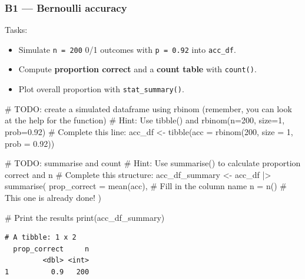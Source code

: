 \documentclass[
  letterpaper,
  DIV=11,
  numbers=noendperiod]{scrartcl}
\newenvironment{Shaded}{\begin{snugshade}}{\end{snugshade}}
\newcommand{\AlertTok}[1]{\textcolor[rgb]{0.68,0.00,0.00}{#1}}
\newcommand{\AttributeTok}[1]{\textcolor[rgb]{0.40,0.45,0.13}{#1}}
\newcommand{\CommentTok}[1]{\textcolor[rgb]{0.37,0.37,0.37}{#1}}
\newcommand{\DecValTok}[1]{\textcolor[rgb]{0.68,0.00,0.00}{#1}}
\newcommand{\FloatTok}[1]{\textcolor[rgb]{0.68,0.00,0.00}{#1}}
\newcommand{\FunctionTok}[1]{\textcolor[rgb]{0.28,0.35,0.67}{#1}}
\newcommand{\NormalTok}[1]{\textcolor[rgb]{0.00,0.23,0.31}{#1}}
\newcommand{\OtherTok}[1]{\textcolor[rgb]{0.00,0.23,0.31}{#1}}
\newcommand{\SpecialCharTok}[1]{\textcolor[rgb]{0.37,0.37,0.37}{#1}}
\providecommand{\tightlist}{%
  \setlength{\itemsep}{0pt}\setlength{\parskip}{0pt}}
\begin{document}
\subsubsection{B1 --- Bernoulli accuracy}\label{b1-bernoulli-accuracy}

Tasks:

\begin{itemize}
\tightlist
\item
  Simulate \texttt{n\ =\ 200} 0/1 outcomes with \texttt{p\ =\ 0.92} into
  \texttt{acc\_df}.
\item
  Compute \textbf{proportion correct} and a \textbf{count table} with
  \texttt{count()}.
\item
  Plot overall proportion with \texttt{stat\_summary()}.
\end{itemize}

\begin{Shaded}
\begin{Highlighting}[]
\CommentTok{\# }\AlertTok{TODO}\CommentTok{: create a simulated dataframe using rbinom (remember, you can look at the help for the function)}
\CommentTok{\# Hint: Use tibble() and rbinom(n=200, size=1, prob=0.92)}
\CommentTok{\# Complete this line:}
\NormalTok{acc\_df }\OtherTok{\textless{}{-}} \FunctionTok{tibble}\NormalTok{(}\AttributeTok{acc =} \FunctionTok{rbinom}\NormalTok{(}\DecValTok{200}\NormalTok{, }\AttributeTok{size =} \DecValTok{1}\NormalTok{, }\AttributeTok{prob =} \FloatTok{0.92}\NormalTok{))}


\CommentTok{\# }\AlertTok{TODO}\CommentTok{: summarise and count}
\CommentTok{\# Hint: Use summarise() to calculate proportion correct and n}
\CommentTok{\# Complete this structure:}
\NormalTok{acc\_df\_summary }\OtherTok{\textless{}{-}}\NormalTok{ acc\_df }\SpecialCharTok{|\textgreater{}}
  \FunctionTok{summarise}\NormalTok{(}
    \AttributeTok{prop\_correct =} \FunctionTok{mean}\NormalTok{(acc),  }\CommentTok{\# Fill in the column name}
    \AttributeTok{n =} \FunctionTok{n}\NormalTok{()                    }\CommentTok{\# This one is already done!}
\NormalTok{  )}

\CommentTok{\# Print the results}
\FunctionTok{print}\NormalTok{(acc\_df\_summary)}
\end{Highlighting}
\end{Shaded}

\begin{verbatim}
# A tibble: 1 x 2
  prop_correct     n
         <dbl> <int>
1          0.9   200
\end{verbatim}
\end{document}
